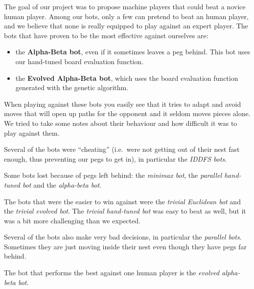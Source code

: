 
The goal of our project was to propose machine players that could beat
a novice human player. Among our bots, only a few can pretend to beat
an human player, and we believe that none is really equipped to play
against an expert player. The bots that have proven to be the most
effective against ourselves are:

\begin{itemize}
  \item the \textbf{Alpha-Beta bot}, even if it sometimes leaves a peg behind.
        This bot uses our hand-tuned board evaluation function.
  \item the \textbf{Evolved Alpha-Beta bot}, which uses the board evaluation
        function generated with the genetic algorithm.
\end{itemize}

When playing against these bots you easily see that it tries to adapt and avoid
moves that will open up paths for the opponent and it seldom moves pieces alone.
We tried to take some notes about their
behaviour and how difficult it was to play against them.

Several of the bots were ``cheating'' (i.e.~were not getting out of their
nest fast enough, thus preventing our pegs to get in), in particular the
\textit{IDDFS bots}.

Some bots lost because of pegs left behind: the \textit{minimax bot}, the
\textit{parallel hand-tuned bot} and the \textit{alpha-beta bot}.

The bots that were the easier to win against were the \textit{trivial Euclidean bot} and
the \textit{trivial evolved bot}. The \textit{trivial hand-tuned bot} was easy
to beat as well, but it was a bit more challenging than we expected.

Several of the bots also make very bad decisions, in particular the
\textit{parallel bots}. Sometimes they are just moving inside their
nest even though they have pegs far behind.

The bot that performs the best against one human player is the
\textit{evolved alpha-beta bot}.
